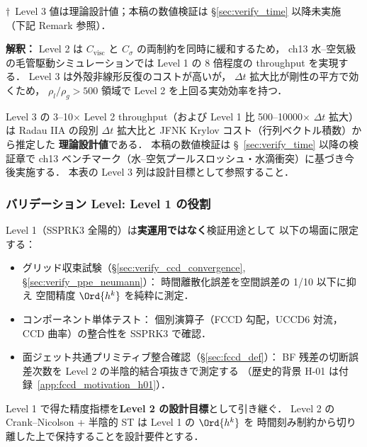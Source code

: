 \smallskip
\noindent$\dagger$\ Level 3 値は理論設計値；本稿の数値検証は §\ref{sec:verify_time} 以降未実施
（下記 Remark 参照）．

\noindent\textbf{解釈：}
Level 2 は $C_\text{visc}$ と $C_\sigma$ の両制約を同時に緩和するため，
ch13 水--空気級の毛管駆動シミュレーションでは
Level 1 の 8 倍程度の throughput を実現する．
Level 3 は外殻非線形反復のコストが高いが，
$\Delta t$ 拡大比が剛性の平方で効くため，
$\rho_l/\rho_g > 500$ 領域で Level 2 を上回る実効効率を持つ．

\begin{tcolorbox}[colback=yellow!8,colframe=yellow!60!black,title=\textbf{Remark：Level 3 コスト見積の検証状態}]
Level 3 の 3--10$\times$ Level 2 throughput（および Level 1 比 500--10000$\times$ $\Delta t$ 拡大）は
Radau IIA の段別 $\Delta t$ 拡大比と JFNK Krylov コスト（行列ベクトル積数）から推定した
\textbf{理論設計値}である．
本稿の数値検証は §~\ref{sec:verify_time} 以降の検証章で
ch13 ベンチマーク（水--空気プールスロッシュ・水滴衝突）に基づき今後実施する．
本表の Level 3 列は設計目標として参照すること．
\end{tcolorbox}

\subsubsection{バリデーション Level: Level 1 の役割}
\label{sec:level1_validation}

Level 1（SSPRK3 全陽的）は\textbf{実運用ではなく}検証用途として
以下の場面に限定する：
\begin{itemize}[noitemsep]
  \item グリッド収束試験（§\ref{sec:verify_ccd_convergence}, §\ref{sec:verify_ppe_neumann}）：
        時間離散化誤差を空間誤差の 1/10 以下に抑え
        空間精度 $\Ord{h^k}$ を純粋に測定．
  \item コンポーネント単体テスト：
        個別演算子（FCCD 勾配，UCCD6 対流，CCD 曲率）の整合性を SSPRK3 で確認．
  \item 面ジェット共通プリミティブ整合確認（§\ref{sec:fccd_def}）：
        BF 残差の切断誤差次数を Level 2 の半陰的結合項抜きで測定する
        （歴史的背景 H-01 は付録~\ref{app:fccd_motivation_h01}）．
\end{itemize}

Level 1 で得た精度指標を\textbf{Level 2 の設計目標}として引き継ぐ．
Level 2 の Crank--Nicolson + 半陰的 ST は Level 1 の $\Ord{h^k}$ を
時間刻み制約から切り離した上で保持することを設計要件とする．

